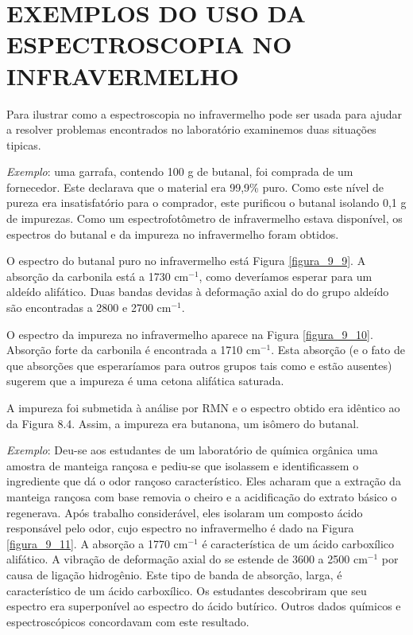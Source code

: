 \section{EXEMPLOS DO USO DA ESPECTROSCOPIA NO INFRAVERMELHO}
Para ilustrar como a espectroscopia no infravermelho pode ser usada para ajudar a resolver problemas encontrados no laboratório examinemos duas situações tipicas. 

\noindent \textit{Exemplo}: uma garrafa, contendo 100 g de butanal, foi comprada de um fornecedor. Este declarava que o material era 99,9\% puro. Como este nível de pureza era insatisfatório para o comprador, este purificou o butanal isolando 0,1 g de impurezas. Como um espectrofotômetro de infravermelho estava disponível, os espectros do butanal e da impureza no infravermelho foram obtidos.

O espectro do butanal puro no infravermelho está Figura \ref{figura_9_9}. A absorção da carbonila está a 1730 cm$^{-1}$, como deveríamos esperar para um aldeído alifático. Duas bandas devidas à deformação axial do  do grupo aldeído são encontradas a 2800 e 2700 cm$^{-1}$.

O espectro da impureza no infravermelho aparece na Figura \ref{figura_9_10}. Absorção forte da carbonila é encontrada a 1710 cm$^{-1}$. Esta absorção (e o fato de que absorções que esperaríamos para outros grupos tais como  e  estão ausentes) sugerem que a impureza é uma cetona alifática saturada. 

A impureza foi submetida à análise por RMN e o espectro obtido era idêntico ao da Figura 8.4. Assim, a impureza era butanona, um isômero do butanal. 

\noindent\textit{Exemplo}: Deu-se aos estudantes de um laboratório de química orgânica uma amostra de manteiga rançosa e pediu-se que isolassem e identificassem o ingrediente que dá o odor rançoso característico. Eles acharam que a extração da manteiga rançosa com base removia o cheiro e a acidificação do extrato básico o regenerava. Após trabalho considerável, eles isolaram um composto ácido responsável pelo odor, cujo espectro no infravermelho é dado na Figura \ref{figura_9_11}. A absorção a 1770 cm$^{-1}$ é característica de um ácido carboxílico alifático. A vibração de deformação axial do  se estende de 3600 a 2500 cm$^{-1}$ por causa de ligação hidrogênio. Este tipo de banda de absorção, larga, é característico de um ácido carboxílico. Os estudantes descobriram que seu espectro era superponível ao espectro do ácido butírico. Outros dados químicos e espectroscópicos concordavam com este resultado.

